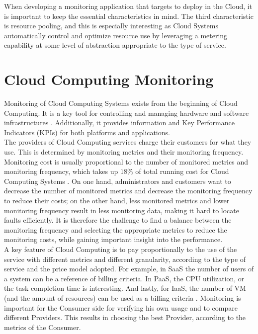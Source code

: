 \noindent
When developing a monitoring application that targets to deploy in the Cloud, it is important to keep the essential characteristics in mind. The third characteristic is resource pooling, and this is especially interesting as Cloud Systems automatically control and optimize resource use by leveraging a metering capability at some level of abstraction appropriate to the type of service.

\section{Cloud Computing Monitoring} \label{sec:intro_monitoring}
Monitoring of Cloud Computing Systems exists from the beginning of Cloud Computing. It is a key tool for controlling and managing hardware and software infrastructures \cite{aceto2013cloud}. Additionally, it provides information and Key Performance Indicators (KPIs) for both platforms and applications.\\

\noindent
The providers of Cloud Computing services charge their customers for what they use. This is determined by monitoring metrics and their monitoring frequency. Monitoring cost is usually proportional to the number of monitored metrics and monitoring frequency, which takes up $18\%$ of total running cost for Cloud Computing Systems \cite{wang2018self}. On one hand, administrators and customers want to decrease the number of monitored metrics and decrease the monitoring frequency to reduce their costs; on the other hand, less monitored metrics and lower monitoring frequency result in less monitoring data, making it hard to locate faults efficiently. It is therefore the challenge to find a balance between the monitoring frequency and selecting the appropriate metrics to reduce the monitoring costs, while gaining important insight into the performance.\\

\noindent
A key feature of Cloud Computing is to pay proportionally to the use of the service with different metrics and different granularity, according to the type of service and the price model adopted. For example, in SaaS the number of users of a system can be a reference of billing criteria. In PaaS, the CPU utilization, or the task completion time is interesting. And lastly, for IaaS, the number of VM (and the amount of resources) can be used as a billing criteria \cite{katsaros2011building}. Monitoring is important for the Consumer side for verifying his own usage and to compare different Providers. This results in choosing the best Provider, according to the metrics of the Consumer.\\

